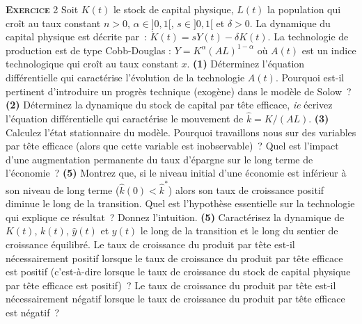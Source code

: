 \documentclass[10pt,a4paper,notitlepage]{article}
\newcommand{\exercice}[1]{\textsc{\textbf{Exercice}} #1}
\newcommand{\question}[1]{\textbf{(#1)}}
\begin{document}
\exercice{2}  Soit $K(t)$  le  stock de  capital  physique, $L(t)$  la
population qui  croît au taux  constant $n>0$, $\alpha \in  ]0,1[$, $s
\in ]0,1[$ et $\delta>0$. La dynamique du capital physique est décrite
par :  $\dot{K}(t)=sY(t)-\delta K(t)$.   La technologie  de production
est de type  Cobb-Douglas : $Y =  K^{\alpha}(AL)^{1-\alpha}$ où $A(t)$
est   un   indice   technologique   qui   croît   au   taux   constant
$x$. \question{1} Déterminez l'équation différentielle qui caractérise
l'évolution  de  la  technologie  $A(t)$.  Pourquoi  est-il  pertinent
d'introduire un progrès technique (exogène)  dans le modèle de Solow ?
\question{2}  Déterminez la  dynamique du  stock de  capital par  tête
efficace,   \textit{ie}   écrivez    l'équation   différentielle   qui
caractérise  le mouvement  de $\hat{k}=K/(AL)$.  \question{3} Calculez
l'état  stationnaire  du modèle.  Pourquoi  travaillons  nous sur  des
variables   par  tête   efficace   (alors  que   cette  variable   est
inobservable) ?  Quel  est l'impact  d'une augmentation  permanente du
taux d'épargne sur le long  terme de l'économie ? \question{5} Montrez
que, si le niveau initial d'une économie est inférieur à son niveau de
long  terme  ($\hat{k}(0)<\hat{k}^*$)  alors son  taux  de  croissance
positif  diminue  le  long  de la  transition.  Quel  est  l'hypothèse
essentielle  sur  la technologie  qui  explique  ce résultat ?  Donnez
l'intuition.   \question{5}  Caractérisez   la  dynamique  de  $K(t)$,
$k(t)$, $\hat y(t)$ et  $y(t)$ le long de la transition  et le long du
sentier de croissance équilibré. Le  taux de croissance du produit par
tête est-il  nécessairement positif lorsque  le taux de  croissance du
produit par tête efficace est positif (c'est-à-dire lorsque le taux de
croissance  du  stock  de  capital  physique  par  tête  efficace  est
positif) ?  Le  taux   de  croissance  du  produit   par  tête  est-il
nécessairement négatif  lorsque le taux  de croissance du  produit par
tête efficace est négatif ?\newline
\end{document}
